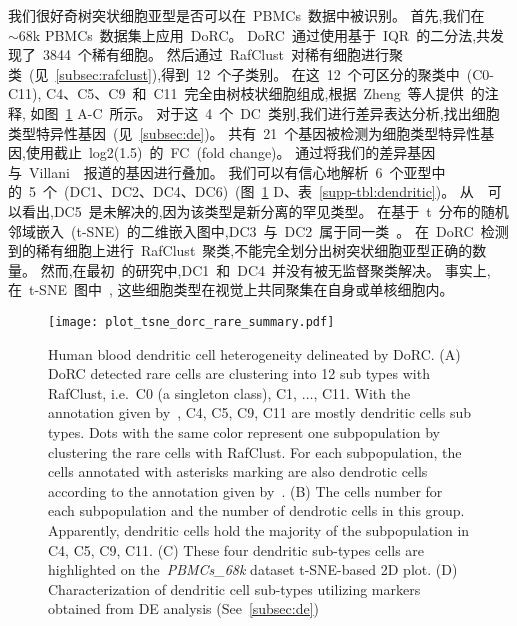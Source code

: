 我们很好奇树突状细胞亚型是否可以在~PBMCs~数据中被识别。
首先,我们在~${\sim}68$k PBMCs~数据集上应用~DoRC。
DoRC~通过使用基于~IQR~的二分法,共发现了~3844~个稀有细胞。
然后通过~RafClust~对稀有细胞进行聚类~(见~\ref{subsec:rafclust}),得到~12~个子类别。
在这~12~个可区分的聚类中~(C0-C11),
C4、C5、C9~和~C11~完全由树枝状细胞组成,根据~Zheng~等人提供~\cite{zheng2017massively}的注释,
如图~\ref{fig:dorc_dendritic} A-C~所示。
对于这~4~个~DC~类别,我们进行差异表达分析,找出细胞类型特异性基因~(见~\ref{subsec:de})。
共有~21~个基因被检测为细胞类型特异性基因,使用截止~log2(1.5)~的~FC~(fold change)。
通过将我们的差异基因与~Villani~\cite{villani2017single}~报道的基因进行叠加。
我们可以有信心地解析~6~个亚型中的~5~个~(DC1、DC2、DC4、DC6)~(图~\ref{fig:dorc_dendritic} D、表~\ref{supp-tbl:dendritic})。
从~\cite{villani2017single}~可以看出,DC5~是未解决的,因为该类型是新分离的罕见类型。
在基于~t~分布的随机邻域嵌入~(t-SNE)~的二维嵌入图中,DC3~与~DC2~属于同一类~\cite{maaten2008visualizing}。
在~DoRC~检测到的稀有细胞上进行~RafClust~聚类,不能完全划分出树突状细胞亚型正确的数量。
然而,在最初~\cite{zheng2017massively}的研究中,DC1~和~DC4~并没有被无监督聚类解决。
事实上,在~t-SNE~图中~\cite{zheng2017massively},
这些细胞类型在视觉上共同聚集在自身或单核细胞内。
\begin{figure}[!htbp]
    \centering
    \texttt{[image: plot\_tsne\_dorc\_rare\_summary.pdf]}
    \caption{Human blood dendritic cell heterogeneity delineated by DoRC. 
    (A) DoRC detected rare cells are clustering into 12 sub types with RafClust, 
    i.e.~C0 (a singleton class), C1, $\ldots$, C11.
    With the annotation given by~\cite{zheng2017massively}, C4, C5, C9, C11 are mostly dendritic cells sub types.
    Dots with the same color represent one subpopulation by clustering the rare cells with RafClust.
    For each subpopulation, the cells annotated with asterisks marking are also dendrotic cells according to the annotation given by~\cite{zheng2017massively}. 
    (B) The cells number for each subpopulation and the number of dendrotic cells in this group. 
    Apparently, dendritic cells hold the majority of the subpopulation in C4, C5, C9, C11.
    (C) These four dendritic sub-types cells are highlighted on the~\textit{PBMCs\_68k} dataset t-SNE-based 2D plot.
    (D) Characterization of dendritic cell sub-types utilizing markers obtained from DE analysis (See~\ref{subsec:de})}
    \label{fig:dorc_dendritic}
\end{figure}

